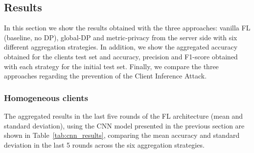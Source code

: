 \documentclass[5p,times]{elsarticle}
\begin{document}
\subsection{Results}\label{sec:results}

In this section we show the results obtained with the three approaches: vanilla FL (baseline, no DP), global-DP and metric-privacy from the server side with six different aggregation strategies. In addition, we show the aggregated accuracy obtained for the clients test set and accuracy, precision and F1-score obtained with each strategy for the initial test set. 
Finally, we compare the three approaches  regarding the prevention of the Client Inference Attack.

\subsubsection{Homogeneous clients}\label{sec:results_iid}

The aggregated results in the last five rounds of the FL architecture (mean and standard deviation), using the CNN model presented in the previous section are shown in Table~\ref{tab:cnn_results}, comparing the mean accuracy and standard deviation in the last 5 rounds across the six aggregation strategies. 
\end{document}
